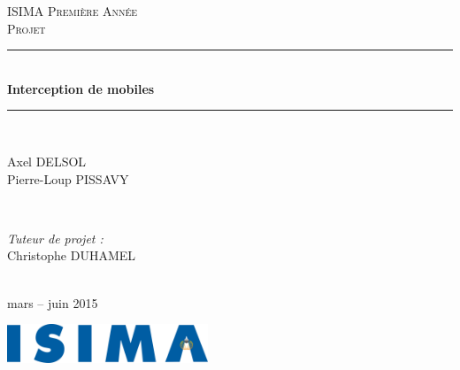 \begin{titlepage}
  \newcommand{\HRule}{\rule{\linewidth}{0.5mm}}
  \center
  \null{}
  \vspace{3cm}

  \textsc{\LARGE ISIMA Première Année}\\[1.5cm]
  \textsc{\Large Projet}\\[1.5cm]
  \HRule \\[0.4cm]
  { \huge \bfseries Interception de mobiles}\\
  \HRule \\[1.5cm]

  \begin{center}
  \end{center}
  \vfill

  \begin{minipage}{0.4\textwidth}
    \begin{flushleft} \large
      Axel DELSOL\\
      Pierre-Loup PISSAVY\\
    \end{flushleft}
  \end{minipage}
  ~
  \begin{minipage}{0.4\textwidth}
    \begin{flushright} \large
      \emph{Tuteur de projet :} \\
      Christophe DUHAMEL
    \end{flushright}
  \end{minipage}\\[1cm]

  {\large mars -- juin 2015}\\[1cm]

  \vfill

  \includegraphics[width=6cm]{settings/ISIMA_logo.pdf}\\[1cm]
\end{titlepage}
